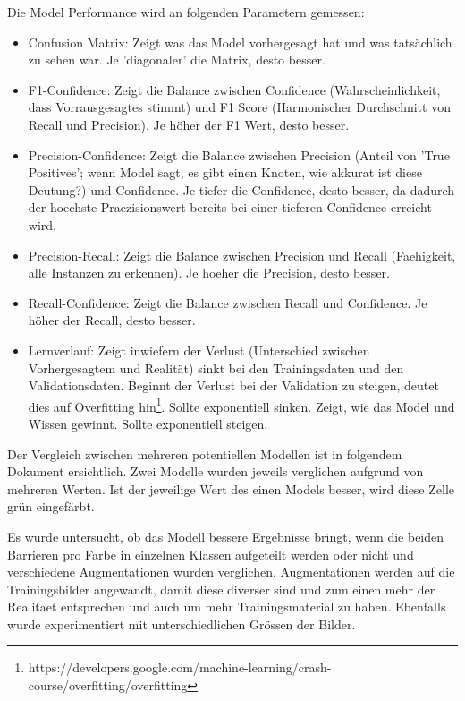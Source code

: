 Die Model Performance wird an folgenden Parametern gemessen:\cite{model-performance}

\begin{itemize}
    \item Confusion Matrix: Zeigt was das Model vorhergesagt hat und was tatsächlich zu sehen war. Je 'diagonaler' die Matrix, desto besser.
    \item F1-Confidence: Zeigt die Balance zwischen Confidence (Wahrscheinlichkeit, dass Vorrausgesagtes stimmt) und F1 Score (Harmonischer Durchschnitt von Recall und Precision). Je höher der F1 Wert, desto besser.
    \item Precision-Confidence: Zeigt die Balance zwischen Precision (Anteil von 'True Positives'; wenn Model sagt, es gibt einen Knoten, wie akkurat ist diese Deutung?) und Confidence. Je tiefer die Confidence, desto besser, da dadurch der hoechste Praezisionswert bereits bei einer tieferen Confidence erreicht wird.
    \item Precision-Recall: Zeigt die Balance zwischen Precision und Recall (Faehigkeit, alle Instanzen zu erkennen). Je hoeher die Precision, desto besser.
    \item Recall-Confidence: Zeigt die Balance zwischen Recall und Confidence. Je höher der Recall, desto besser.
    \item Lernverlauf: Zeigt inwiefern der Verlust (Unterschied zwischen Vorhergesagtem und Realität) sinkt bei den Trainingsdaten und den Validationsdaten. Beginnt der Verlust bei der Validation zu steigen, deutet dies auf Overfitting hin\footnote{https://developers.google.com/machine-learning/crash-course/overfitting/overfitting}. Sollte exponentiell sinken. Zeigt, wie das Model und Wissen gewinnt. Sollte exponentiell steigen.
\end{itemize}


Der Vergleich zwischen mehreren potentiellen Modellen ist in folgendem Dokument ersichtlich. Zwei Modelle wurden jeweils verglichen aufgrund von mehreren Werten. Ist der jeweilige Wert des einen Models besser, wird diese Zelle grün eingefärbt.

Es wurde untersucht, ob das Modell bessere Ergebnisse bringt, wenn die beiden Barrieren pro Farbe in einzelnen Klassen aufgeteilt werden oder nicht und verschiedene Augmentationen wurden verglichen. Augmentationen werden auf die Trainingsbilder angewandt, damit diese diverser sind und zum einen mehr der Realitaet entsprechen und auch um mehr Trainingsmaterial zu haben. Ebenfalls wurde experimentiert mit unterschiedlichen Grössen der Bilder. 

